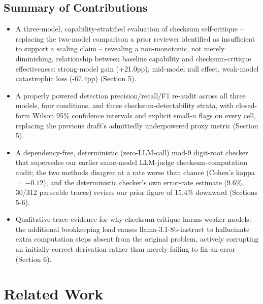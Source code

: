 \documentclass[11pt,letterpaper]{article}
\begin{document}
\subsection{Summary of Contributions}

\begin{itemize}
\item A three-model, capability-stratified evaluation of checksum self-critique -- replacing the two-model comparison a prior reviewer identified as insufficient to support a scaling claim -- revealing a non-monotonic, not merely diminishing, relationship between baseline capability and checksum-critique effectiveness: strong-model gain (+21.0pp), mid-model null effect, weak-model catastrophic loss (-67.4pp) (Section 5).
\item A properly powered detection precision/recall/F1 re-audit across all three models, four conditions, and three checksum-detectability strata, with closed-form Wilson 95\% confidence intervals and explicit small-$n$ flags on every cell, replacing the previous draft's admittedly underpowered proxy metric (Section 5).
\item A dependency-free, deterministic (zero-LLM-call) mod-9 digit-root checker that supersedes our earlier same-model LLM-judge checksum-computation audit; the two methods disagree at a rate worse than chance (Cohen's kappa$=-0.12$), and the deterministic checker's own error-rate estimate (9.6\%, 30/312 parseable traces) revises our prior figure of 15.4\% downward (Sections 5-6).
\item Qualitative trace evidence for why checksum critique harms weaker models: the additional bookkeeping load causes llama-3.1-8b-instruct to hallucinate extra computation steps absent from the original problem, actively corrupting an initially-correct derivation rather than merely failing to fix an error (Section 6).
\end{itemize}

\section{Related Work}
\end{document}

